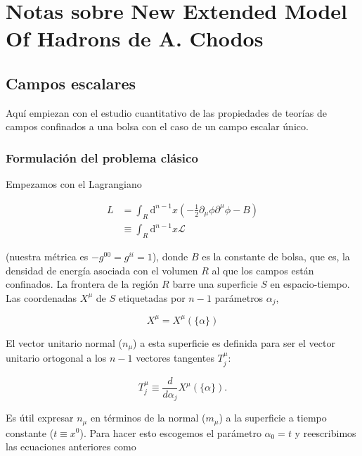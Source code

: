 \chapter{Notas sobre New Extended Model Of Hadrons de A. Chodos}

\section{Campos escalares}

Aquí empiezan con el estudio cuantitativo de las propiedades de teorías de campos confinados a una bolsa con el caso de un campo escalar único.

\subsection{Formulación del problema clásico}

Empezamos con el Lagrangiano

\begin{equation}
\begin{array}{rl}
L&= \int_{R} {\mathrm{d}}^{n-1} x (- \frac{1}{2} {\partial}_{\mu} {\phi} {\partial}^{\mu} {\phi} - B) \\
& \equiv \int_{R} {\mathrm{d}}^{n - 1} x \mathscr{L}
\end{array}
\end{equation}

(nuestra métrica es $- {g}^{00} = {g}^{ii} = 1$), donde $B$ es la constante de bolsa, que es, la densidad de energía asociada con el volumen $R$ al que los campos están confinados. La frontera de la región $R$ barre una superficie $S$ en espacio-tiempo. Las coordenadas ${X}^{\mu}$ de $S$ etiquetadas por $n-1$ parámetros ${\alpha}_{j}$,

\begin{equation}
{X}^{\mu} = {X}^{\mu}(\{ \alpha \})
\end{equation}

El vector unitario normal (${n}_{\mu}$) a esta superficie es definida para ser el vector unitario ortogonal a los $n-1$ vectores tangentes ${T}_{j}^{\mu}$:

\begin{equation}
{T}_{j}^{\mu} \equiv \frac{d}{d{\alpha}_{j}} {X}^{\mu} (\{ \alpha\}).
\end{equation}

Es útil expresar ${n}_{\mu}$ en términos de la normal (${m}_{\mu}$) a la superficie a tiempo constante ($t \equiv {x}^{0}$). Para hacer esto escogemos el parámetro ${\alpha}_{0} = t $ y reescribimos las ecuaciones anteriores como

